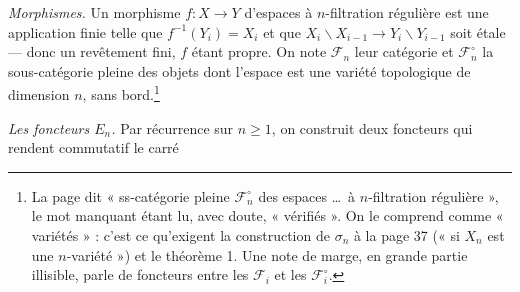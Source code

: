 \documentclass[11pt,a4paper]{article}
\begin{document}
\emph{Morphismes.} Un morphisme $f : X \to Y$ d'espaces à $n$-filtration
régulière est une application finie telle que $f^{-1}(Y_i) = X_i$ et que $X_i
\smallsetminus X_{i-1} \to Y_i \smallsetminus Y_{i-1}$ soit étale --- donc un
revêtement fini, $f$ étant propre. On note $\mathcal{F}_n$ leur catégorie et
$\mathcal{F}_n^\circ$ la sous-catégorie pleine des objets dont l'espace est
une variété topologique de dimension $n$, sans bord.\footnote{La page dit
« ss-catégorie pleine $\mathcal{F}_n^\circ$ des espaces \ldots\ à
$n$-filtration régulière », le mot manquant étant lu, avec doute,
« vérifiés ». On le comprend comme « variétés » : c'est ce qu'exigent la
construction de $\sigma_n$ à la page 37 (« si $X_n$ est une $n$-variété ») et
le théorème 1. Une note de marge, en grande partie illisible, parle de
foncteurs entre les $\mathcal{F}_i$ et les $\mathcal{F}_i^\circ$.}

\emph{Les foncteurs $E_n$.} Par récurrence sur $n \geqslant 1$, on construit
deux foncteurs qui rendent commutatif le carré

\end{document}
